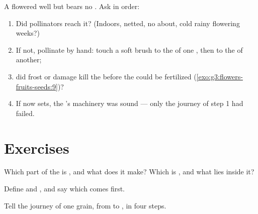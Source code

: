 \begin{method}\label{met:g5:flower-to-fruit:diagnose}
A  flowered well but bears no . Ask in order:
\begin{enumerate}
  \item Did pollinators reach it? (Indoors, netted, no
         about, cold rainy flowering weeks?)
  \item If not, pollinate by hand: touch a soft brush to the
         of one , then to the  of
        another;
  \item did frost or damage kill the  before the
         could be fertilized
        (\cref{exo:g3:flowers-fruits-seeds:9})?
  \item If  now sets, the 's machinery was sound
        --- only the journey of step 1 had failed.
\end{enumerate}
\end{method}

\section{Exercises}

\begin{exercise}[$\star$]\label{exo:g5:flower-to-fruit:1}
Which part of the  is , and what does it make?
Which is , and what lies inside it?
\end{exercise}

\begin{exercise}[$\star$]\label{exo:g5:flower-to-fruit:2}
Define  and , and say which comes
first.
\end{exercise}

\begin{exercise}[$\star$]\label{exo:g5:flower-to-fruit:3}
Tell the journey of one  grain, from  to , in four steps.
\end{exercise}

